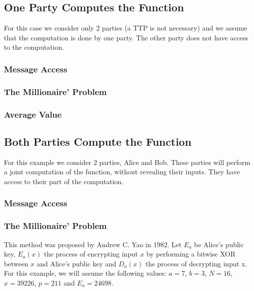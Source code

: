 \subsection{One Party Computes the Function}
For this case we consider only 2 parties (a TTP is not necessary) and we assume that the computation is done by one party.
The other party does not have access to the computation.

\subsubsection{Message Access}
\subsubsection{The Millionaire' Problem}
\subsubsection{Average Value}

\subsection{Both Parties Compute the Function}
For this example we consider 2 parties, Alice and Bob. These parties will perform a joint computation of the function, without revealing
their inputs. They have access to their part of the computation.

\subsubsection{Message Access}
\subsubsection{The Millionaire' Problem}
This method was proposed by Andrew C. Yao in 1982. Let $E_a$ be Alice's public key, $E_a(x)$ the process of encrypting input $x$ by performing
a bitwise XOR between $x$ and Alice's public key and $D_a(x)$ the process of decrypting input x.
For this example, we will assume the following values: $a = 7$, $b = 3$, $N = 16$, $x = 39226$, $p = 211$ and $E_a = 24698$.

